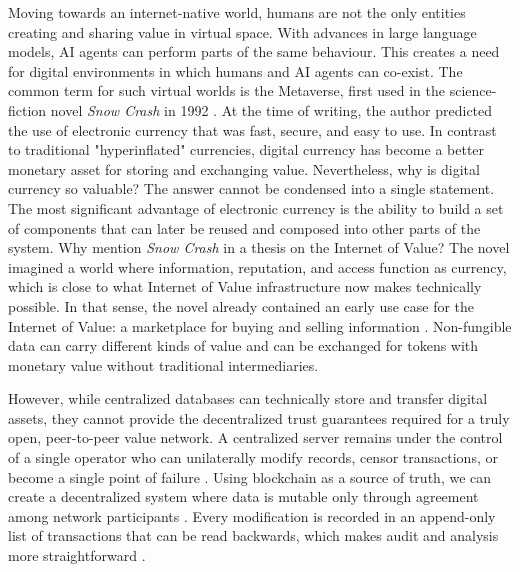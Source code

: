 Moving towards an internet-native world, humans are not the only entities creating and sharing value in virtual space. With advances in large language models, AI agents can perform parts of the same behaviour. This creates a need for digital environments in which humans and AI agents can co-exist. The common term for such virtual worlds is the Metaverse, first used in the science-fiction novel \emph{Snow Crash} in 1992 \cite{Stephenson1992}.
At the time of writing, the author predicted the use of electronic currency that was fast, secure, and easy to use. In contrast to traditional "hyperinflated" currencies, digital currency has become a better monetary asset for storing and exchanging value.
Nevertheless, why is digital currency so valuable? The answer cannot be condensed into a single statement.
The most significant advantage of electronic currency is the ability to build a set of components that can later be reused and composed into other parts of the system.
Why mention \emph{Snow Crash} in a thesis on the Internet of Value? The novel imagined a world where information, reputation, and access function as currency, which is close to what Internet of Value infrastructure now makes technically possible. In that sense, the novel already contained an early use case for the Internet of Value: a marketplace for buying and selling information \cite{Cao2022, Kraus2022}.
Non-fungible data can carry different kinds of value and can be exchanged for tokens with monetary value without traditional intermediaries.


However, while centralized databases can technically store and transfer digital assets, they cannot provide the decentralized trust guarantees required for a truly open, peer-to-peer value network. A centralized server remains under the control of a single operator who can unilaterally modify records, censor transactions, or become a single point of failure \cite{Chowdhury2018}.
Using blockchain as a source of truth, we can create a decentralized system where data is mutable only through agreement among network participants \cite{Zheng2017}.
Every modification is recorded in an append-only list of transactions that can be read backwards, which makes audit and analysis more straightforward \cite{Wang2022}.

